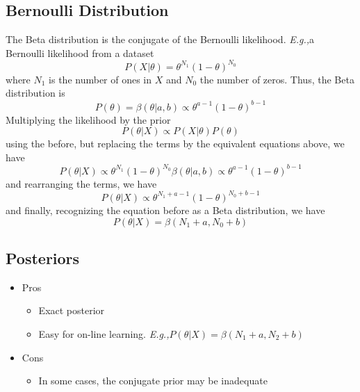 \documentclass{article}
\newcommand{\Eg}{\textit{E.g.,}}
\begin{document}
\subsection{Bernoulli Distribution}
The Beta distribution is the conjugate of the Bernoulli likelihood. \Eg a Bernoulli likelihood from a dataset
\begin{equation}
    P(X|\theta) = \theta^{N_1}(1-\theta)^{N_0}
\end{equation}
where $N_1$ is the number of ones in $X$ and $N_0$ the number of zeros. Thus, the Beta distribution is
\begin{equation}
    P(\theta) = \beta(\theta|a, b) \propto \theta^{a-1}(1-\theta)^{b-1}
\end{equation}
Multiplying the likelihood by the prior
\begin{equation}
    P(\theta|X) \propto P(X|\theta)P(\theta)
\end{equation}
using the before, but replacing the terms by the equivalent equations above, we have
\begin{equation}
    P(\theta|X) \propto \theta^{N_1}(1-\theta)^{N_0} \beta(\theta|a, b) \propto \theta^{a-1}(1-\theta)^{b-1}
\end{equation}
and rearranging the terms, we have
\begin{equation}
    P(\theta|X) \propto \theta^{N_1 + a - 1}(1 - \theta)^{N_0 + b - 1}
\end{equation}
and finally, recognizing the equation before as a Beta distribution, we have
\begin{equation}
    P(\theta|X) = \beta(N_1 + a, N_0 + b)
\end{equation}

\subsection{Posteriors}
\begin{itemize}
    \item Pros \begin{itemize}
        \item Exact posterior
        \item Easy for on-line learning. \Eg $P(\theta|X) = \beta(N_1 + a, N_2 + b)$
    \end{itemize}
    
    \item Cons \begin{itemize}
        \item In some cases, the conjugate prior may be inadequate
    \end{itemize}
\end{itemize}
\end{document}

